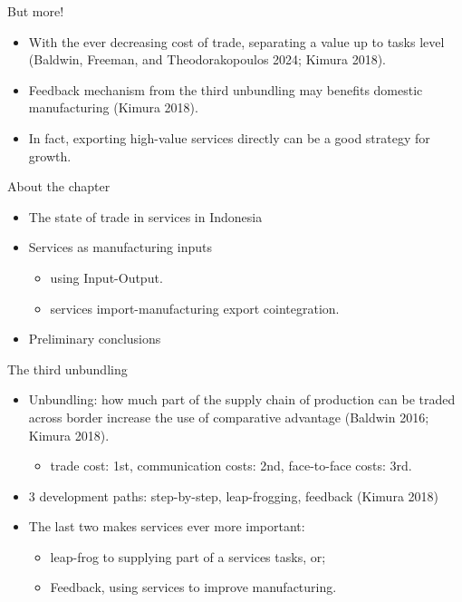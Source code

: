 \documentclass[
  ignorenonframetext,
]{beamer}
\providecommand{\tightlist}{%
  \setlength{\itemsep}{0pt}\setlength{\parskip}{0pt}}\usepackage{longtable,booktabs,array}
\begin{document}
\begin{frame}{But more!}
\label{but-more}
\begin{itemize}
\item
  With the ever decreasing cost of trade, separating a value up to tasks
  level (Baldwin, Freeman, and Theodorakopoulos 2024; Kimura 2018).
\item
  Feedback mechanism from the third unbundling may benefits domestic
  manufacturing (Kimura 2018).
\item
  In fact, exporting high-value services directly can be a good strategy
  for growth.
\end{itemize}
\end{frame}

\begin{frame}{About the chapter}
\label{about-the-chapter}
\begin{itemize}
\item
  The state of trade in services in Indonesia
\item
  Services as manufacturing inputs

  \begin{itemize}
  \item
    using Input-Output.
  \item
    services import-manufacturing export cointegration.
  \end{itemize}
\item
  Preliminary conclusions
\end{itemize}
\end{frame}

\begin{frame}{The third unbundling}
\label{the-third-unbundling}
\begin{itemize}
\item
  Unbundling: how much part of the supply chain of production can be
  traded across border increase the use of comparative advantage
  (Baldwin 2016; Kimura 2018).

  \begin{itemize}
  \tightlist
  \item
    trade cost: 1st, communication costs: 2nd, face-to-face costs: 3rd.
  \end{itemize}
\item
  3 development paths: step-by-step, leap-frogging, feedback (Kimura
  2018)
\item
  The last two makes services ever more important:

  \begin{itemize}
  \item
    leap-frog to supplying part of a services tasks, or;
  \item
    Feedback, using services to improve manufacturing.
  \end{itemize}
\end{itemize}
\end{frame}
\end{document}
